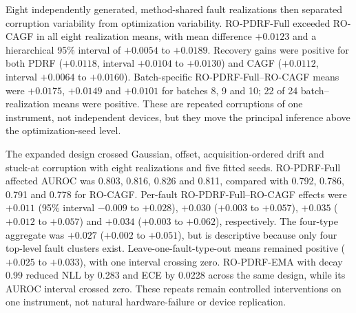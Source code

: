 \documentclass[11pt]{article}
\begin{document}
\begin{table}[ht]
\centering
\caption{Consistency-training ladder under the unique chemical headline fault. Values are means across 10 matched optimization seeds. Differences and 95\% intervals are paired against clean distillation within architecture; $P$ values are exact two-sided Wilcoxon tests.}
\label{tab:major5-ladder}
\resizebox{\textwidth}{!}{}
\end{table}

\begin{table}[ht]
\centering
\caption{Published/adapted baselines and teacher controls under the principal chemical fault. Values are affected-subset means across 10 matched seeds after temperature scaling. Role distinguishes comparison baselines, the practical default, mechanistic Full model, calibration sensitivity and diagnostic audits. Lite adds clean recovery distillation; Full also adds Brier, ranking and response-interior terms. CRA and ECA are agreement controls; CE-conflict is label-assisted and training-only. Lower NLL, Brier and ECE are better.}
\label{tab:major7-controls}
\resizebox{\textwidth}{!}{}
\end{table}

Eight independently generated, method-shared fault realizations then separated corruption variability from optimization variability. RO-PDRF-Full exceeded RO-CAGF in all eight realization means, with mean difference $+0.0123$ and a hierarchical 95\% interval of $+0.0054$ to $+0.0189$. Recovery gains were positive for both PDRF ($+0.0118$, interval $+0.0104$ to $+0.0130$) and CAGF ($+0.0112$, interval $+0.0064$ to $+0.0160$). Batch-specific RO-PDRF-Full--RO-CAGF means were $+0.0175$, $+0.0149$ and $+0.0101$ for batches 8, 9 and 10; 22 of 24 batch--realization means were positive. These are repeated corruptions of one instrument, not independent devices, but they move the principal inference above the optimization-seed level.

The expanded design crossed Gaussian, offset, acquisition-ordered drift and stuck-at corruption with eight realizations and five fitted seeds. RO-PDRF-Full affected AUROC was 0.803, 0.816, 0.826 and 0.811, compared with 0.792, 0.786, 0.791 and 0.778 for RO-CAGF. Per-fault RO-PDRF-Full--RO-CAGF effects were $+0.011$ (95\% interval $-0.009$ to $+0.028$), $+0.030$ ($+0.003$ to $+0.057$), $+0.035$ ($+0.012$ to $+0.057$) and $+0.034$ ($+0.003$ to $+0.062$), respectively. The four-type aggregate was $+0.027$ ($+0.002$ to $+0.051$), but is descriptive because only four top-level fault clusters exist. Leave-one-fault-type-out means remained positive ($+0.025$ to $+0.033$), with one interval crossing zero. RO-PDRF-EMA with decay 0.99 reduced NLL by 0.283 and ECE by 0.0228 across the same design, while its AUROC interval crossed zero. These repeats remain controlled interventions on one instrument, not natural hardware-failure or device replication.
\end{document}
